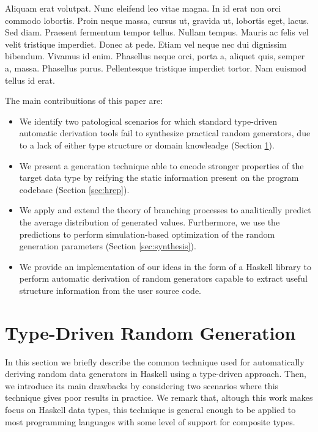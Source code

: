 \documentclass[conference, fleqn]{IEEEtran}
\begin{document}
Aliquam erat volutpat. Nunc eleifend leo vitae magna. In id erat non orci
commodo lobortis. Proin neque massa, cursus ut, gravida ut, lobortis eget,
lacus. Sed diam. Praesent fermentum tempor tellus. Nullam tempus. Mauris ac
felis vel velit tristique imperdiet. Donec at pede. Etiam vel neque nec dui
dignissim bibendum. Vivamus id enim. Phasellus neque orci, porta a, aliquet
quis, semper a, massa. Phasellus purus. Pellentesque tristique imperdiet tortor.
Nam euismod tellus id erat\cite{grieco2017}.

The main contribuitions of this paper are:
%
\begin{itemize}
\item We identify two patological scenarios for which standard type-driven
  automatic derivation tools fail to synthesize practical random generators, due
  to a lack of either type structure or domain knowleadge (Section
  \ref{sec:randomtesting}).
\item We present a generation technique able to encode stronger properties of
  the target data type by reifying the static information present on the program
  codebase (Section \ref{sec:hrep}).
\item We apply and extend the theory of branching processes to analitically
  predict the average distribution of generated values.
  Furthermore, we use the predictions to perform simulation-based optimization
  of the random generation parameters (Section \ref{sec:synthesis}).
\item We provide an implementation of our ideas in the form of a Haskell library
  to perform automatic derivation of random generators capable to extract useful
  structure information from the user source code.
\end{itemize}
\section{Type-Driven Random Generation} \label{sec:randomtesting}

In this section we briefly describe the common technique used for automatically
deriving random data generators in Haskell using a type-driven approach.
%
Then, we introduce its main drawbacks by considering two scenarios where this
technique gives poor results in practice.
%
We remark that, altough this work makes focus on Haskell data types, this
technique is general enough to be applied to most programming languages with
some level of support for composite types.
\end{document}
